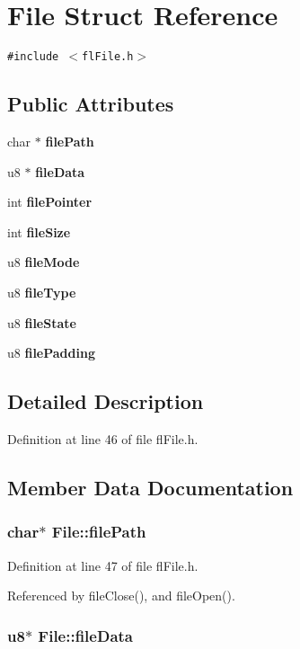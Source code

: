 \section{File Struct Reference}
\label{structFile}
{\tt \#include $<$fl\-File.h$>$}

\subsection*{Public Attributes}
\begin{CompactItemize}
\item 
char $\ast$ {\bf file\-Path}
\item 
u8 $\ast$ {\bf file\-Data}
\item 
int {\bf file\-Pointer}
\item 
int {\bf file\-Size}
\item 
u8 {\bf file\-Mode}
\item 
u8 {\bf file\-Type}
\item 
u8 {\bf file\-State}
\item 
u8 {\bf file\-Padding}
\end{CompactItemize}


\subsection{Detailed Description}




Definition at line 46 of file fl\-File.h.

\subsection{Member Data Documentation}
\subsubsection{\setlength{\rightskip}{0pt plus 5cm}char$\ast$ {\bf File::file\-Path}}\label{structFile_2abfebf695f855b2d7a682bbfaa10499}




Definition at line 47 of file fl\-File.h.

Referenced by file\-Close(), and file\-Open().
\subsubsection{\setlength{\rightskip}{0pt plus 5cm}u8$\ast$ {\bf File::file\-Data}}\label{structFile_110e0ce5b7d509412dd57a43a7c29b09}





